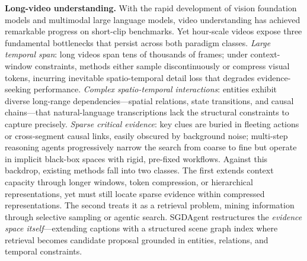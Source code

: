 \documentclass[sigconf, screen, review, anonymous]{acmart}
\begin{document}
\textbf{Long-video understanding.}
With the rapid development of vision foundation models\cite{radford2021CLIP,li2022GLIP} and multimodal large language models\cite{llava2023,video-llava2024,bai2025qwen3vl}, video understanding has achieved remarkable progress on short-clip benchmarks\cite{caba2015activitynet}.  Yet hour-scale videos expose three fundamental bottlenecks that persist across both paradigm classes.
\emph{Large temporal span}: long videos span tens of thousands of frames; under context-window constraints, methods either sample discontinuously\cite{deepvideo2025} or compress visual tokens\cite{wang2025adaretake}, incurring inevitable spatio-temporal detail loss that degrades evidence-seeking performance\cite{lvbench,longvideobench2024}.
\emph{Complex spatio-temporal interactions}: entities exhibit diverse long-range dependencies—spatial relations, state transitions, and causal chains—that natural-language transcriptions lack the structural constraints to capture precisely\cite{zhang2024simplellm}.
\emph{Sparse critical evidence}: key clues are buried in fleeting actions or cross-segment causal links, easily obscured by background noise; multi-step reasoning agents\cite{videoagent,omagent2024} progressively narrow the search from coarse to fine but operate in implicit black-box spaces with rigid, pre-fixed workflows.
Against this backdrop, existing methods fall into two classes.  The first extends context capacity through longer windows, token compression, or hierarchical representations\cite{gemini15,qwen,internvl,seed,radford2021CLIP,li2022GLIP,llava2023,video-llava2024,bai2025qwen3vl,longvu2025,shu2025video,apollo2025}, yet must still locate sparse evidence within compressed representations.  The second treats it as a retrieval problem, mining information through selective sampling or agentic search\cite{deepvideo2025,mrvideo,videoseek,zhang2024simplellm,videorag2025,videotree2025,drvideo2025,yang2025vca}.  SGDAgent restructures the \emph{evidence space itself}—extending captions with a structured scene graph index where retrieval becomes candidate proposal grounded in entities, relations, and temporal constraints.
\end{document}
